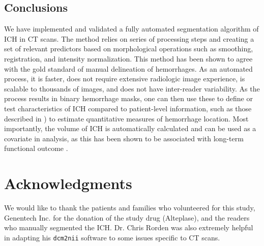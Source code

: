 \documentclass{elsarticle_nonatbib}\usepackage[]{graphicx}\usepackage[]{color}
\newcommand{\code}[1]{\texttt{#1}}
\begin{document}


\subsection{Conclusions}
We have implemented and validated a fully automated segmentation algorithm of ICH in CT scans.  The method relies on series of processing steps and  creating a set of relevant predictors based on morphological operations such as smoothing, registration, and intensity normalization.  This method has been shown to agree with the gold standard of manual delineation of hemorrhages.  As an automated process, it is faster, does not require extensive radiologic image experience, is scalable to thousands of images, and does not have inter-reader variability.  As the process results in binary hemorrhage masks, one can then use these to define or test characteristics of ICH compared to patient-level information, such as those described in \citet{muschelli2015quantitative}) to estimate quantitative measures of hemorrhage location.  Most importantly, the volume of ICH is automatically calculated and can be used as a covariate in analysis, as this has been shown to be associated with long-term functional outcome \citep{broderick_volume_1993, jordan2009intracerebral, tuhrim_volume_1999}.  


\section*{Acknowledgments}
We would like to thank the patients and families who volunteered for this study, Genentech Inc. for the donation of the study drug (Alteplase), and the readers who manually segmented the ICH.  Dr. Chris Rorden was also extremely helpful in adapting his \code{dcm2nii} software to some issues specific to CT scans.
\end{document}
